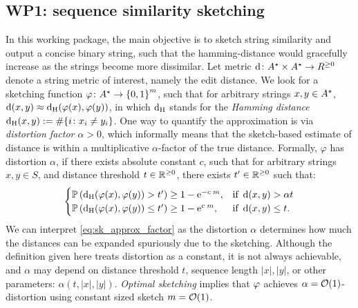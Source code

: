 

\subsection{WP1: sequence similarity sketching}
In this working package, the main objective is to sketch string similarity and output a concise binary string, such that the hamming-distance would gracefully increase as the strings become more dissimilar. Let metric $\operatorname{\mathrm{d}} \colon A^\star\times A^\star\to R^{\ge 0}$ denote a string metric of interest, namely the edit distance. We look for a sketching function $\operatorname{\varphi}\colon A^\star\to\left\{0,1\right\}^m$, such that for arbitrary strings $x,y\in A^\star$, $\operatorname{\mathrm{d}}(x,y)\approx \operatorname{\mathrm{d_{H}}}(\operatorname{\varphi}(x),\operatorname{\varphi}(y))$, in which $\operatorname{\mathrm{d_{H}}}$ stands for the \emph{Hamming distance} $\operatorname{\mathrm{d_{H}}}(x,y):=\#\{i\colon x_i\neq y_i\}$. One way to quantify the approximation is via \emph{distortion factor $\alpha>0$}, which informally means that the sketch-based estimate of distance is within a multiplicative $\alpha$-factor of the true distance. 
Formally, $\varphi$ has distortion $\alpha$, if there exists absolute constant $c$, such that for arbitrary strings $x,y\in S$, and distance threshold $t\in\mathbb{R}^{\ge 0}$, there exists $t'\in\mathbb{R}^{\ge 0}$ such that: 
\begin{equation}
\label{eq:sk_approx_factor}
\begin{cases} 
\mathbb{P}\left( \operatorname{\mathrm{d_{H}}}(\varphi(x),\varphi(y))> t' \right)\ge 1-\text{e}^{-c \; m},& \text{if }  \operatorname{\mathrm{d}}(x,y)>\alpha t\\
\mathbb{P}\left( \operatorname{\mathrm{d_{H}}}(\varphi(x),\varphi(y))\le t' \right)\ge 1-\text{e}^{c \; m}, & \text{if } \operatorname{\mathrm{d}}(x,y)\le t.
\end{cases}
\end{equation}
We can interpret \eqref{eq:sk_approx_factor} as the distortion $\alpha$ determines how much the distances can be expanded spuriously due to the sketching. 
Although the definition given here treats distortion as a constant, it is not always achievable, and $\alpha$ may depend on distance threshold $t$, sequence length $|x|,|y|$, or other parameters: $\alpha(t,|x|,|y|)$. \emph{Optimal sketching} implies that $\operatorname{\varphi}$ achieves $\alpha=\mathcal{O}(1)$-distortion using constant sized sketch $m=\mathcal{O}(1)$.  


